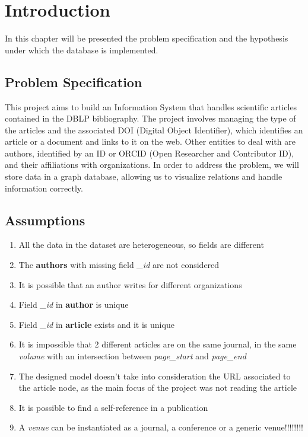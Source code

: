 \documentclass{Configuration_Files/PoliMi3i_thesis}
\begin{document}
\mainmatter %

\chapter{Introduction}
\label{ch:introduction}%

In this chapter will be presented the problem specification and the hypothesis under which the database is implemented.

\section{Problem Specification}
\label{sec:prob_specs}
This project aims to build an Information System that handles scientific articles contained in the DBLP
bibliography. The project involves managing the type of the articles and the associated DOI (Digital Object Identifier),
which identifies an article or a document and links to it on the web. Other entities to deal with are authors, identified by
an ID or ORCID (Open Researcher and Contributor ID), and their affiliations with organizations. In order to address the
problem, we will store data in a graph database, allowing us to visualize relations and handle information correctly.


\section{Assumptions}
\label{sec:assumptions}
\begin{enumerate}
    \item All the data in the dataset are heterogeneous, so fields are different
    \item The \textbf{authors} with missing field \emph{\_id} are not considered
    \item It is possible that an author writes for different organizations
    \item Field \emph{\_id} in \textbf{author} is unique
    \item Field \emph{\_id} in \textbf{article} exists and it is unique
    \item It is impossible that 2 different articles are on the same journal, in the same \emph{volume} with an intersection between \emph{page\_start} and \emph{page\_end}
    \item The designed model doesn't take into consideration the URL associated to the article node, as the main focus of the project was not reading the article
    \item It is possible to find a self-reference in a publication
    \item A \emph{venue} can be instantiated as a journal, a conference or a generic venue!!!!!!!!
\end{enumerate}
\end{document}

